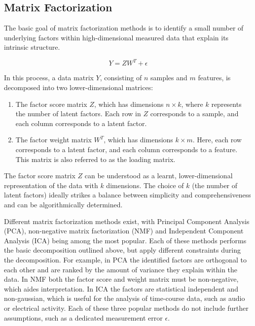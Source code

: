\begin{flushleft}
\subsection{Matrix Factorization}
The basic goal of matrix factorization methods is to identify a small number of underlying factors within high-dimensional measured data that explain its intrinsic structure. 

\begin{equation}
    Y = ZW^T + \epsilon
\end{equation}

In this process, a data matrix \( Y \), consisting of \( n \) samples and \( m \) features, is decomposed into two lower-dimensional matrices: 

\begin{enumerate}
    \item The factor score matrix \( Z \), which has dimensions \( n \times k \), where \( k \) represents the number of latent factors. Each row in \( Z \) corresponds to a sample, and each column corresponds to a latent factor.
    \item The factor weight matrix \( W^T \), which has dimensions \( k \times m \). Here, each row corresponds to a latent factor, and each column corresponds to a feature. This matrix is also referred to as the loading matrix. 
\end{enumerate}

The factor score matrix \( Z \) can be understood as a learnt, lower-dimensional representation of the data with \( k \) dimensions. The choice of \( k \) (the number of latent factors) ideally strikes a balance between simplicity and comprehensiveness and can be algorithmically determined. 

Different matrix factorization methods exist, with Principal Component Analysis (PCA), non-negative matrix factorization (NMF) and Independent Component Analysis (ICA) being among the most popular. Each of these methods performs the basic decomposition outlined above, but apply different constraints during the decomposition. For example, in PCA the identified factors are orthogonal to each other and are ranked by the amount of variance they explain within the data. In NMF both the factor score and weight matrix must be non-negative, which aides interpretation. In ICA the factors are statistical independent and non-gaussian, which is useful for the analysis of time-course data, such as audio or electrical activity. Each of these three popular methods do not include further assumptions, such as a dedicated measurement error \(\epsilon\).


\end{flushleft}
